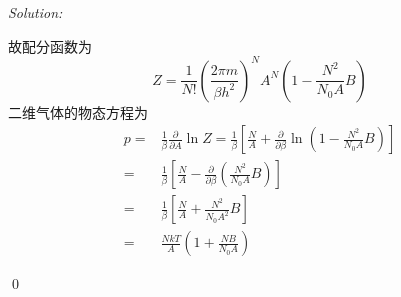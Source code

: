 \documentclass[12pt,a4paper]{article}
\newenvironment{sol}
    {\emph{Solution:}
    }
    {
    \qed
    }
\begin{document}
\begin{sol}
故配分函数为
\begin{equation}
Z=\frac{1}{N!}\left(\frac{2\pi m}{\beta h^2}\right)^NA^N\left(1-\frac{N^2}{N_0A}B\right)
\end{equation}
二维气体的物态方程为
\begin{align}
\nonumber p=&\frac{1}{\beta}\frac{\partial}{\partial A}\ln Z=\frac{1}{\beta}\left[\frac{N}{A}+\frac{\partial}{\partial\beta}\ln\left(1-\frac{N^2}{N_0A}B\right)\right]\\
\nonumber=&\frac{1}{\beta}\left[\frac{N}{A}-\frac{\partial}{\partial\beta}\left(\frac{N^2}{N_0A}B\right)\right]\\
\nonumber=&\frac{1}{\beta}\left[\frac{N}{A}+\frac{N^2}{N_0A^2}B\right]\\
=&\frac{NkT}{A}\left(1+\frac{NB}{N_0A}\right)
\end{align}
\end{sol}
\end{document}
